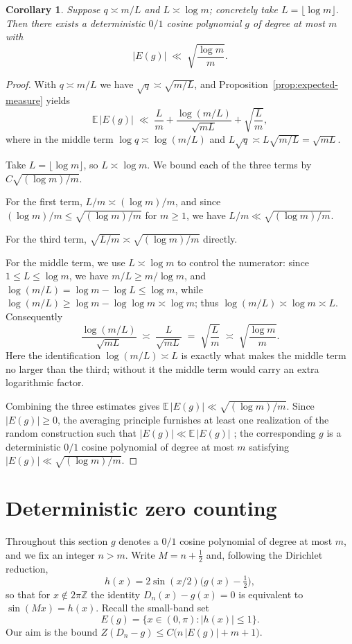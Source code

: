 \documentclass[11pt,reqno]{amsart}
\theoremstyle{plain}
\newtheorem{corollary}{Corollary}
\theoremstyle{definition}
\theoremstyle{remark}
\begin{document}
\begin{corollary}\label{cor:existence-g}
Suppose $q\asymp m/L$ and $L\asymp\log m$; concretely take $L=\lfloor\log m\rfloor$. Then there exists a deterministic $0/1$ cosine polynomial $g$ of degree at most $m$ with
\[
|E(g)|\;\ll\;\sqrt{\frac{\log m}{m}}.
\]
\end{corollary}

\begin{proof}
With $q\asymp m/L$ we have $\sqrt q\asymp\sqrt{m/L}$, and Proposition~\ref{prop:expected-measure} yields
\[
\mathbb{E}\,|E(g)|
\;\ll\;\frac{L}{m}+\frac{\log(m/L)}{\sqrt{mL}}+\sqrt{\frac{L}{m}},
\]
where in the middle term $\log q\asymp\log(m/L)$ and $L\sqrt q\asymp L\sqrt{m/L}=\sqrt{mL}$.

Take $L=\lfloor\log m\rfloor$, so $L\asymp\log m$. We bound each of the three terms by $C\sqrt{(\log m)/m}$.

For the first term, $L/m\asymp(\log m)/m$, and since $(\log m)/m\le\sqrt{(\log m)/m}$ for $m\ge 1$, we have $L/m\ll\sqrt{(\log m)/m}$.

For the third term, $\sqrt{L/m}\asymp\sqrt{(\log m)/m}$ directly.

For the middle term, we use $L\asymp\log m$ to control the numerator: since $1\le L\le\log m$, we have $m/L\ge m/\log m$, and $\log(m/L)=\log m-\log L\le\log m$, while $\log(m/L)\ge\log m-\log\log m\asymp\log m$; thus $\log(m/L)\asymp\log m\asymp L$. Consequently
\[
\frac{\log(m/L)}{\sqrt{mL}}\;\asymp\;\frac{L}{\sqrt{mL}}\;=\;\sqrt{\frac{L}{m}}\;\asymp\;\sqrt{\frac{\log m}{m}}.
\]
Here the identification $\log(m/L)\asymp L$ is exactly what makes the middle term no larger than the third; without it the middle term would carry an extra logarithmic factor.

Combining the three estimates gives $\mathbb{E}\,|E(g)|\ll\sqrt{(\log m)/m}$. Since $|E(g)|\ge 0$, the averaging principle furnishes at least one realization of the random construction such that $|E(g)|\ll \mathbb{E}\,|E(g)|$ ; the corresponding $g$ is a deterministic $0/1$ cosine polynomial of degree at most $m$ satisfying $|E(g)|\ll\sqrt{(\log m)/m}$.
\end{proof}

\section{Deterministic zero counting}

Throughout this section $g$ denotes a $0/1$ cosine polynomial of degree at most $m$, and we fix an integer $n>m$. Write $M=n+\tfrac12$ and, following the Dirichlet reduction,
\[
  h(x)=2\sin(x/2)\bigl(g(x)-\tfrac12\bigr),
\]
so that for $x\notin 2\pi\mathbb Z$ the identity $D_n(x)-g(x)=0$ is equivalent to $\sin(Mx)=h(x)$. Recall the small-band set
\[
  E(g)=\{x\in(0,\pi):|h(x)|\le 1\}.
\]
Our aim is the bound $Z(D_n-g)\le C\bigl(n\,|E(g)|+m+1\bigr)$.
\end{document}
